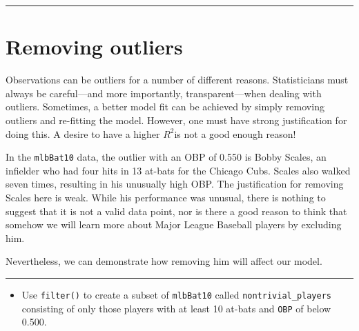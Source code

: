 \documentclass[
]{book}
\newenvironment{Shaded}{\begin{snugshade}}{\end{snugshade}}
\newcommand{\CommentTok}[1]{\textcolor[rgb]{0.56,0.35,0.01}{\textit{#1}}}
\newcommand{\DecValTok}[1]{\textcolor[rgb]{0.00,0.00,0.81}{#1}}
\newcommand{\FloatTok}[1]{\textcolor[rgb]{0.00,0.00,0.81}{#1}}
\newcommand{\KeywordTok}[1]{\textcolor[rgb]{0.13,0.29,0.53}{\textbf{#1}}}
\newcommand{\NormalTok}[1]{#1}
\newcommand{\OperatorTok}[1]{\textcolor[rgb]{0.81,0.36,0.00}{\textbf{#1}}}
\newcommand{\StringTok}[1]{\textcolor[rgb]{0.31,0.60,0.02}{#1}}
\providecommand{\tightlist}{%
  \setlength{\itemsep}{0pt}\setlength{\parskip}{0pt}}
\begin{document}
\begin{center}\rule{0.5\linewidth}{0.5pt}\end{center}

\hypertarget{removing-outliers}{%
\section{Removing outliers}\label{removing-outliers}}

Observations can be outliers for a number of different reasons. Statisticians must always be careful---and more importantly, transparent---when dealing with outliers. Sometimes, a better model fit can be achieved by simply removing outliers and re-fitting the model. However, one must have strong justification for doing this. A desire to have a higher \(R^2\)is not a good enough reason!

In the \texttt{mlbBat10} data, the outlier with an OBP of 0.550 is Bobby Scales, an infielder who had four hits in 13 at-bats for the Chicago Cubs. Scales also walked seven times, resulting in his unusually high OBP. The justification for removing Scales here is weak. While his performance was unusual, there is nothing to suggest that it is not a valid data point, nor is there a good reason to think that somehow we will learn more about Major League Baseball players by excluding him.

Nevertheless, we can demonstrate how removing him will affect our model.

\begin{center}\rule{0.5\linewidth}{0.5pt}\end{center}

\begin{itemize}
\tightlist
\item
  Use \texttt{filter()} to create a subset of \texttt{mlbBat10} called \texttt{nontrivial\_players} consisting of only those players with at least 10 at-bats and \texttt{OBP} of below 0.500.
\end{itemize}

\begin{Shaded}
\end{Shaded}
\end{document}
